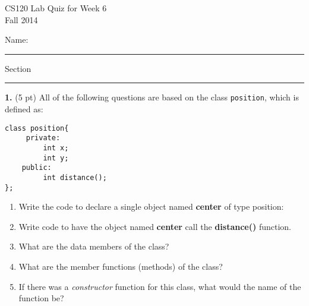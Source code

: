 \documentclass[12pt,openbib]{article}
\begin{document}
\thispagestyle{empty}
\vspace{-1.0in}
\Large
\begin{center}
\textsf{CS120  Lab Quiz for Week 6}\\
\large
\textsf{Fall 2014}
\end{center}
\vspace{-0.2in}
\large\textsf{Name: }\rule[-0.01in]{2.5in}{0.015in}
\hspace{0.5in} Section \rule[-0.01in]{1.0in}{0.015in}

\normalsize
\rm

{\bf 1.} (5 pt)  All of the following questions are based on the class {\tt position}, which is defined as:
\begin{verbatim}
class position{
     private:
         int x;
         int y;
    public:
         int distance();
};
\end{verbatim}

\begin{enumerate}
\item Write the code to declare a single object named \textbf{center} of type position:
\vspace{1cm}
\item Write code to have the object named \textbf{center} call the \textbf{distance()} function.
\vspace{1cm}
\item What are the data members of the class?
\vspace{1cm}
\item What are the member functions (methods) of the class?
\vspace{1cm}
\item If there was a \emph{constructor} function for this class, what would the name of the function be?


\end{enumerate}
\end{document}
